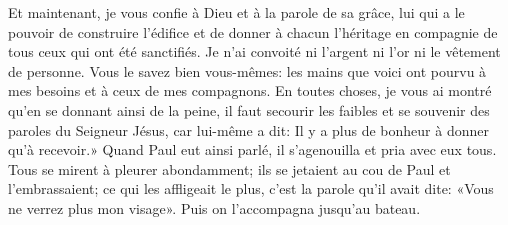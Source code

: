 Et maintenant, je vous confie à Dieu et à la parole de sa grâce,
	lui qui a le pouvoir de construire l’édifice
	et de donner à chacun l’héritage
		en compagnie de tous ceux qui ont été sanctifiés.
Je n’ai convoité ni l’argent ni l’or ni le vêtement de personne.
Vous le savez bien vous-mêmes:
	les mains que voici ont pourvu à mes besoins et à ceux de mes compagnons.
En toutes choses, je vous ai montré
	qu’en se donnant ainsi de la peine, il faut secourir les faibles
	et se souvenir des paroles du Seigneur Jésus,
	car lui-même a dit: Il y a plus de bonheur à donner qu’à recevoir.»
Quand Paul eut ainsi parlé, il s’agenouilla et pria avec eux tous.
Tous se mirent à pleurer abondamment;
	ils se jetaient au cou de Paul et l’embrassaient;
	ce qui les affligeait le plus, c’est la parole qu’il avait dite:
	«Vous ne verrez plus mon visage».
Puis on l’accompagna jusqu’au bateau.
